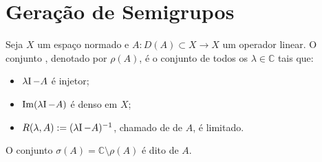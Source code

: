 \section{Geração de Semigrupos}

\begin{definition}
Seja $X$ um espaço normado e $A:D(A)\subset X\longrightarrow X$ um operador linear. O conjunto ,  denotado por $\rho(A)$, é o conjunto de todos os $\lambda\in \mathbb{C}$ tais que:
\begin{itemize}
    \item $\lambda \operatorname{\!I} -A$ é injetor;
	\item $\operatorname{Im}(\lambda \operatorname{\!I}-A)$ é denso em $X$;
    \item $R(\lambda,A):=(\lambda \operatorname{\!I} -A)^{-1}$, chamado de   de $A$, é limitado.
\end{itemize}
O conjunto $\sigma(A)=\mathbb{C}\setminus\rho(A)$ é dito   de $A$.

\end{definition}